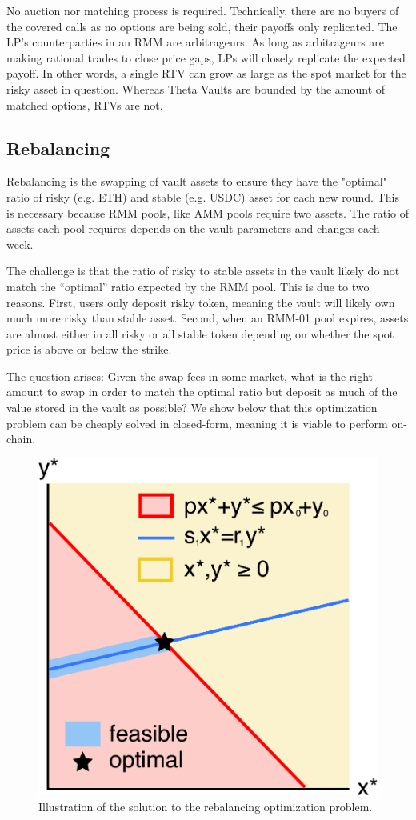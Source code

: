 \documentclass[hidelinks, 12pt]{article}
\begin{document}
No auction nor matching process is required. Technically, there are no buyers of the covered calls as no options are being sold, their payoffs only replicated. The LP's counterparties in an RMM are arbitrageurs. As long as arbitrageurs are making rational trades to close price gaps, LPs will closely replicate the expected payoff. In other words, a single RTV can grow as large as the spot market for the risky asset in question. Whereas Theta Vaults are bounded by the amount of matched options, RTVs are not.

\subsection{Rebalancing}
\label{sec:rebalance}

Rebalancing is the swapping of vault assets to ensure they have the "optimal" ratio of risky (e.g. ETH) and stable (e.g. USDC) asset for each new round. This is necessary because RMM pools, like AMM pools require two assets. The ratio of assets each pool requires depends on the vault parameters and changes each week.

The challenge is that the ratio of risky to stable assets in the vault likely do not match the ``optimal'' ratio expected by the RMM pool.
This is due to two reasons.
First, users only deposit risky token, meaning the vault will likely own much more risky than stable asset.
Second, when an RMM-01 pool expires, assets are almost either in all risky or all stable token depending on whether the spot price is above or below the strike.

The question arises: Given the swap fees in some market, what is the right amount to swap in order to match the optimal ratio but deposit as much of the value stored in the vault as possible? We show below that this optimization problem can be cheaply solved in closed-form, meaning it is viable to perform on-chain.

\begin{figure}[h!]
    \centering
    \includegraphics[width=0.5\linewidth]{images/rebalance.pdf}
    \caption{Illustration of the solution to the rebalancing optimization problem.}
    \label{fig:rebalance}
\end{figure}
\end{document}
